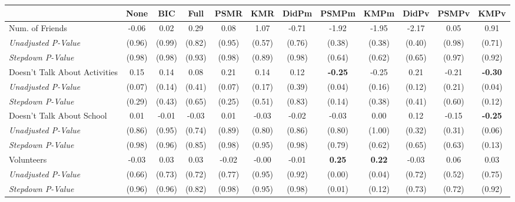 \begin{tabular}{l c c c c c c c c c c c}
\toprule
 & None & BIC & Full & PSMR & KMR & DidPm & PSMPm & KMPm & DidPv & PSMPv & KMPv \\
\midrule
Num. of Friends & -0.06 & 0.02 & 0.29 & 0.08 & 1.07 & -0.71 & -1.92 & -1.95 & -2.17 & 0.05 & 0.91 \\
\quad \textit{Unadjusted P-Value} & (0.96) & (0.99) & (0.82) & (0.95) & (0.57) & (0.76) & (0.38) & (0.38) & (0.40) & (0.98) & (0.71) \\
\quad \textit{Stepdown P-Value} & (0.98) & (0.98) & (0.93) & (0.98) & (0.89) & (0.98) & (0.64) & (0.62) & (0.65) & (0.97) & (0.92) \\
Doesn't Talk About Activities & 0.15 & 0.14 & 0.08 & 0.21 & 0.14 & 0.12 & \textbf{ -0.25 } & -0.25 & 0.21 & -0.21 & \textbf{ -0.30 } \\
\quad \textit{Unadjusted P-Value} & (0.07) & (0.14) & (0.41) & (0.07) & (0.17) & (0.39) & (0.04) & (0.16) & (0.12) & (0.21) & (0.04) \\
\quad \textit{Stepdown P-Value} & (0.29) & (0.43) & (0.65) & (0.25) & (0.51) & (0.83) & (0.14) & (0.38) & (0.41) & (0.60) & (0.12) \\
Doesn't Talk About School & 0.01 & -0.01 & -0.03 & 0.01 & -0.03 & -0.02 & -0.03 & 0.00 & 0.12 & -0.15 & \textbf{ -0.25 } \\
\quad \textit{Unadjusted P-Value} & (0.86) & (0.95) & (0.74) & (0.89) & (0.80) & (0.86) & (0.80) & (1.00) & (0.32) & (0.31) & (0.06) \\
\quad \textit{Stepdown P-Value} & (0.98) & (0.96) & (0.85) & (0.98) & (0.95) & (0.98) & (0.79) & (0.62) & (0.65) & (0.63) & (0.13) \\
Volunteers & -0.03 & 0.03 & 0.03 & -0.02 & -0.00 & -0.01 & \textbf{ 0.25 } & \textbf{ 0.22 } & -0.03 & 0.06 & 0.03 \\
\quad \textit{Unadjusted P-Value} & (0.66) & (0.73) & (0.72) & (0.77) & (0.95) & (0.92) & (0.00) & (0.04) & (0.72) & (0.52) & (0.75) \\
\quad \textit{Stepdown P-Value} & (0.96) & (0.96) & (0.82) & (0.98) & (0.95) & (0.98) & (0.01) & (0.12) & (0.73) & (0.72) & (0.92) \\
\bottomrule
\end{tabular}
